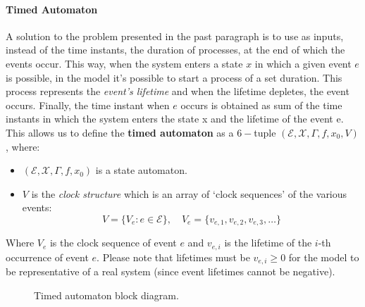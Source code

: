 \documentclass[12pt,a4paper]{article}
\begin{document}
\paragraph{Timed Automaton}
A solution to the problem presented in the past paragraph is to use as inputs, instead of the time instants, the duration of processes, at the end of which the events occur. This way, when the system enters a state $x$ in which a given event $e$ is possible, in the model it’s possible to start a process of a set duration. This process represents the \textit{event's lifetime} and when the lifetime depletes, the event occurs. Finally, the time instant when $e$ occurs is obtained as sum of the time instants in which the system enters the state x and the lifetime of the event e.
This allows us to define the \textbf{timed automaton} as a $6-$tuple $(\mathcal{E},\mathcal{X},\Gamma,f,x_0,V)$, where: 
\begin{itemize}
\item $(\mathcal{E},\mathcal{X},\Gamma,f,x_0)$ is a state automaton. 
\item $V$ is the \textit{clock structure} which is an array of `clock sequences’ of the various events:
$$
V=\{V_e : e\in\mathcal{E}\}, \quad V_e=\{v_{e,1}, v_{e,2}, v_{e,3},\dots\}
$$
\end{itemize}	
\noindent
Where $V_e$ is the clock sequence of event $e$ and $v_{e,i}$ is the lifetime of the $i$-th occurrence of event $e$. Please note that lifetimes must be $v_{e,i} \ge 0$ for the model to be representative of a real system (since event lifetimes cannot be negative).

\begin{figure}[H]
	\begin{flushright}
	\end{flushright}	
	\caption{Timed automaton block diagram.}
	\label{fig:timedAut}
\end{figure}
\end{document}
